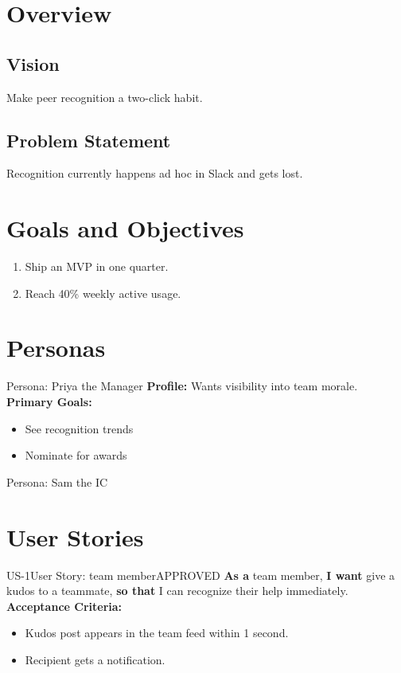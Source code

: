 \documentclass[11pt,a4paper]{article}
\begin{document}
\section{Overview}
\subsection{Vision}
Make peer recognition a two-click habit.

\subsection{Problem Statement}
Recognition currently happens ad hoc in Slack and gets lost.

\section{Goals and Objectives}
\begin{enumerate}[leftmargin=*]
    \item Ship an MVP in one quarter.
    \item Reach 40\% weekly active usage.
\end{enumerate}

\section{Personas}
\begin{infobox}{Persona: Priya the Manager}
\textbf{Profile:} Wants visibility into team morale.\\
\vspace{3pt}\textbf{Primary Goals:}
\begin{itemize}[leftmargin=*,itemsep=1pt,topsep=2pt]
    \item See recognition trends
    \item Nominate for awards
\end{itemize}
\end{infobox}

\begin{infobox}{Persona: Sam the IC}
\end{infobox}

\section{User Stories}
\begin{requirementbox}{US-1}{User Story: team member}{APPROVED}
\textbf{As a} team member, \textbf{I want} give a kudos to a teammate, \textbf{so that} I can recognize their help immediately.
\vspace{4pt}\\
\textbf{Acceptance Criteria:}
\begin{itemize}[leftmargin=*,itemsep=1pt,topsep=2pt]
    \item Kudos post appears in the team feed within 1 second.
    \item Recipient gets a notification.
\end{itemize}
\end{requirementbox}
\end{document}
